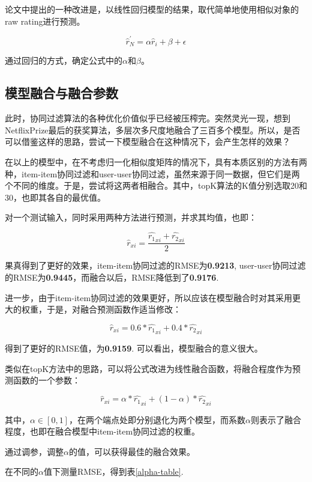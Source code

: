 \documentclass[utf8, a4paper, 11pt, onecolumn]{ctexart}
\begin{document}
\begin{spacing}{1.25}
论文\cite{sarwar2001item}中提出的一种改进是，以线性回归模型的结果，取代简单地使用相似对象的raw rating进行预测。

\[\hat{r}^{'}_{N} = \alpha \hat{r}_i + \beta + \epsilon \]

通过回归的方式，确定公式中的$\alpha$和$\beta$。

\subsection{模型融合与融合参数}

此时，协同过滤算法的各种优化价值似乎已经被压榨完。突然灵光一现，想到NetflixPrize最后的获奖算法，多层次多尺度地融合了三百多个模型\cite{koren2009bellkor}。所以，是否可以借鉴这样的思路，尝试一下模型融合在这种情况下，会产生怎样的效果？

在以上的模型中，在不考虑归一化相似度矩阵的情况下，具有本质区别的方法有两种，item-item协同过滤和user-user协同过滤，虽然来源于同一数据，但它们是两个不同的维度。于是，尝试将这两者相融合。其中，topK算法的K值分别选取20和30，也即其各自的最优值。

对一个测试输入，同时采用两种方法进行预测，并求其均值，也即：

\[\hat{r}_{xi} = \frac{\hat{r_1}_{xi} + \hat{r_2}_{xi}}{2}\]

果真得到了更好的效果，item-item协同过滤的RMSE为\textbf{0.9213}, user-user协同过滤的RMSE为\textbf{0.9445}，而融合以后，RMSE降低到了\textbf{0.9176}.

进一步，由于item-item协同过滤的效果更好，所以应该在模型融合时对其采用更大的权重，于是，对融合预测函数作适当修改：

\[\hat{r}_{xi} = 0.6 * \hat{r_1}_{xi} + 0.4 * \hat{r_2}_{xi}\]

得到了更好的RMSE值，为\textbf{0.9159}. 可以看出，模型融合的意义很大。

类似在topK方法中的思路，可以将公式改进为线性融合函数，将融合程度作为预测函数的一个参数：

\[\hat{r}_{xi} = \alpha * \hat{r_1}_{xi} + (1-\alpha) * \hat{r_2}_{xi}\]

其中，$\alpha \in [0, 1]$，在两个端点处即分别退化为两个模型，而系数$\alpha$则表示了融合程度，也即在融合模型中item-item协同过滤的权重。

通过调参，调整$\alpha$的值，可以获得最佳的融合效果。

在不同的$\alpha$值下测量RMSE，得到表\ref{alpha-table}.


\end{spacing}
\end{document}
